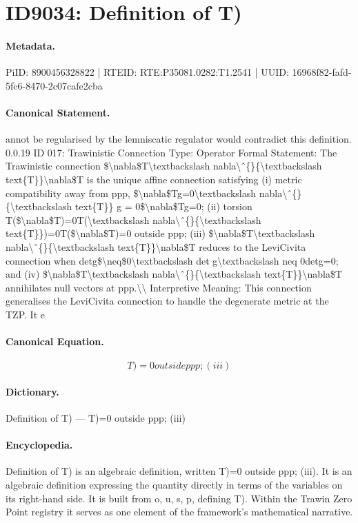 \section*{ID9034: Definition of T)}
\paragraph{Metadata.}
PiID: 8900456328822 | RTEID: RTE:P35081.0282:T1.2541 | UUID: 16968f82-fafd-5fc6-8470-2c07cafe2cba

\paragraph{Canonical Statement.}
annot be regularised by the lemniscatic regulator would contradict this definition. 0.0.19 ID 017: Trawinistic Connection Type: Operator Formal Statement: The Trawinistic connection \$\textbackslash{}nabla\$T\textbackslash{}textbackslash nabla\textbackslash{}ˆ\{\}\{\textbackslash{}textbackslash text\{T\}\}\textbackslash{}nabla\$T is the unique affine connection satisfying (i) metric compatibility away from ppp, \$\textbackslash{}nabla\$Tg=0\textbackslash{}textbackslash nabla\textbackslash{}ˆ\{\}\{\textbackslash{}textbackslash text\{T\}\} g = 0\$\textbackslash{}nabla\$Tg=0; (ii) torsion T(\$\textbackslash{}nabla\$T)=0T(\textbackslash{}textbackslash nabla\textbackslash{}ˆ\{\}\{\textbackslash{}textbackslash text\{T\}\})=0T(\$\textbackslash{}nabla\$T)=0 outside ppp; (iii) \$\textbackslash{}nabla\$T\textbackslash{}textbackslash nabla\textbackslash{}ˆ\{\}\{\textbackslash{}textbackslash text\{T\}\}\textbackslash{}nabla\$T reduces to the LeviCivita connection when detg\$\textbackslash{}neq\$0\textbackslash{}textbackslash det g\textbackslash{}textbackslash neq 0detg=0; and (iv) \$\textbackslash{}nabla\$T\textbackslash{}textbackslash nabla\textbackslash{}ˆ\{\}\{\textbackslash{}textbackslash text\{T\}\}\textbackslash{}nabla\$T annihilates null vectors at ppp.\textbackslash{}\textbackslash{} Interpretive Meaning: This connection generalises the LeviCivita connection to handle the degenerate metric at the TZP. It e

\paragraph{Canonical Equation.}
\[
T)=0 outside ppp; (iii)
\]

\paragraph{Dictionary.}
Definition of T) — T)=0 outside ppp; (iii)

\paragraph{Encyclopedia.}
Definition of T) is an algebraic definition, written T)=0 outside ppp; (iii). It is an algebraic definition expressing the quantity directly in terms of the variables on its right-hand side. It is built from o, u, s, p, defining T). Within the Trawin Zero Point registry it serves as one element of the framework's mathematical narrative.
